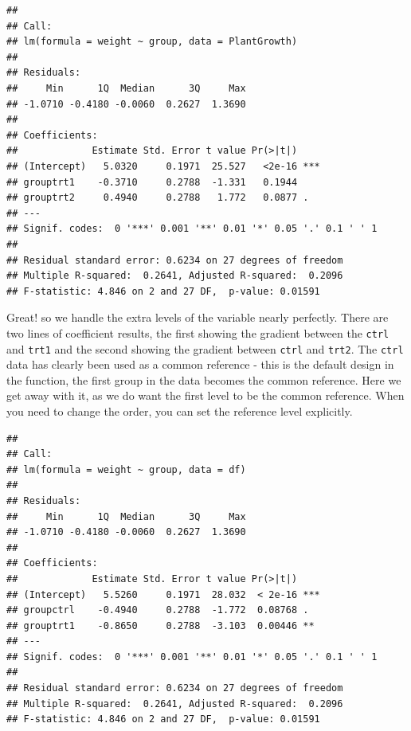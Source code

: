 \documentclass[
]{book}
\newenvironment{Shaded}{\begin{snugshade}}{\end{snugshade}}
\newcommand{\AttributeTok}[1]{\textcolor[rgb]{0.77,0.63,0.00}{#1}}
\newcommand{\FunctionTok}[1]{\textcolor[rgb]{0.00,0.00,0.00}{#1}}
\newcommand{\NormalTok}[1]{#1}
\newcommand{\OtherTok}[1]{\textcolor[rgb]{0.56,0.35,0.01}{#1}}
\newcommand{\SpecialCharTok}[1]{\textcolor[rgb]{0.00,0.00,0.00}{#1}}
\newcommand{\StringTok}[1]{\textcolor[rgb]{0.31,0.60,0.02}{#1}}
\begin{document}
\begin{verbatim}
## 
## Call:
## lm(formula = weight ~ group, data = PlantGrowth)
## 
## Residuals:
##     Min      1Q  Median      3Q     Max 
## -1.0710 -0.4180 -0.0060  0.2627  1.3690 
## 
## Coefficients:
##             Estimate Std. Error t value Pr(>|t|)    
## (Intercept)   5.0320     0.1971  25.527   <2e-16 ***
## grouptrt1    -0.3710     0.2788  -1.331   0.1944    
## grouptrt2     0.4940     0.2788   1.772   0.0877 .  
## ---
## Signif. codes:  0 '***' 0.001 '**' 0.01 '*' 0.05 '.' 0.1 ' ' 1
## 
## Residual standard error: 0.6234 on 27 degrees of freedom
## Multiple R-squared:  0.2641,	Adjusted R-squared:  0.2096 
## F-statistic: 4.846 on 2 and 27 DF,  p-value: 0.01591
\end{verbatim}

Great! so we handle the extra levels of the variable nearly perfectly. There are two lines of coefficient results, the first showing the gradient between the \texttt{ctrl} and \texttt{trt1} and the second showing the gradient between \texttt{ctrl} and \texttt{trt2}. The \texttt{ctrl} data has clearly been used as a common reference - this is the default design in the function, the first group in the data becomes the common reference. Here we get away with it, as we do want the first level to be the common reference. When you need to change the order, you can set the reference level explicitly.

\begin{Shaded}
\end{Shaded}

\begin{verbatim}
## 
## Call:
## lm(formula = weight ~ group, data = df)
## 
## Residuals:
##     Min      1Q  Median      3Q     Max 
## -1.0710 -0.4180 -0.0060  0.2627  1.3690 
## 
## Coefficients:
##             Estimate Std. Error t value Pr(>|t|)    
## (Intercept)   5.5260     0.1971  28.032  < 2e-16 ***
## groupctrl    -0.4940     0.2788  -1.772  0.08768 .  
## grouptrt1    -0.8650     0.2788  -3.103  0.00446 ** 
## ---
## Signif. codes:  0 '***' 0.001 '**' 0.01 '*' 0.05 '.' 0.1 ' ' 1
## 
## Residual standard error: 0.6234 on 27 degrees of freedom
## Multiple R-squared:  0.2641,	Adjusted R-squared:  0.2096 
## F-statistic: 4.846 on 2 and 27 DF,  p-value: 0.01591
\end{verbatim}
\end{document}
